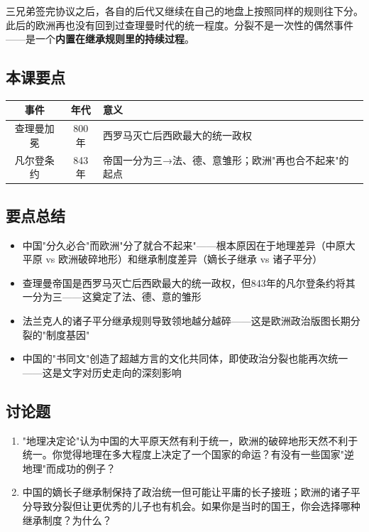 \documentclass[a4paper,12pt]{ctexart}
\begin{document}
三兄弟签完协议之后，各自的后代又继续在自己的地盘上按照同样的规则往下分。此后的欧洲再也没有回到过查理曼时代的统一程度。分裂不是一次性的偶然事件——是一个\textbf{内置在继承规则里的持续过程}。

\subsection*{本课要点}

\begin{center}
\begin{tabular}{|c|c|p{7cm}|}
\hline
\textbf{事件} & \textbf{年代} & \textbf{意义} \\
\hline
查理曼加冕 & 800年 & 西罗马灭亡后西欧最大的统一政权 \\
\hline
凡尔登条约 & 843年 & 帝国一分为三→法、德、意雏形；欧洲"再也合不起来"的起点 \\
\hline
\end{tabular}
\end{center}

\subsection*{要点总结}
\begin{itemize}
  \item 中国"分久必合"而欧洲"分了就合不起来"——根本原因在于地理差异（中原大平原 vs 欧洲破碎地形）和继承制度差异（嫡长子继承 vs 诸子平分）
  \item 查理曼帝国是西罗马灭亡后西欧最大的统一政权，但843年的凡尔登条约将其一分为三——这奠定了法、德、意的雏形
  \item 法兰克人的诸子平分继承规则导致领地越分越碎——这是欧洲政治版图长期分裂的"制度基因"
  \item 中国的"书同文"创造了超越方言的文化共同体，即使政治分裂也能再次统一——这是文字对历史走向的深刻影响
\end{itemize}

\subsection*{讨论题}
\begin{enumerate}
  \item "地理决定论"认为中国的大平原天然有利于统一，欧洲的破碎地形天然不利于统一。你觉得地理在多大程度上决定了一个国家的命运？有没有一些国家"逆地理"而成功的例子？
  \item 中国的嫡长子继承制保持了政治统一但可能让平庸的长子接班；欧洲的诸子平分导致分裂但让更优秀的儿子也有机会。如果你是当时的国王，你会选择哪种继承制度？为什么？
\end{enumerate}
\end{document}
